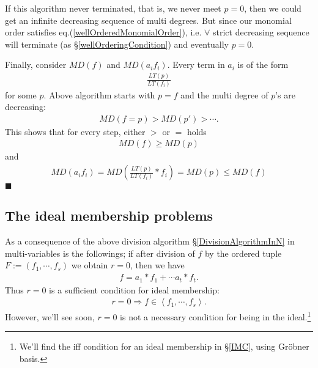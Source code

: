 \documentclass[11pt]{book}
\begin{document}
If this algorithm never terminated, that is, we never meet $p =0$, then we could get an infinite decreasing sequence of multi degrees.
But since our monomial order satisfies eq.(\ref{wellOrderedMonomialOrder}), i.e. $\forall$ strict decreasing sequence will terminate (as \S\ref{wellOrderingCondition}) and eventually $p = 0$. 

Finally, consider $MD(f)$ and $MD(a_i f_i)$.
Every term in $a_i$ is of the form 
\begin{eqnarray}
\frac{LT(p)}{LT(f_i)}
\end{eqnarray}
for some $p$.
Above algorithm starts with $p = f$ and the multi degree of $p$'s are decreasing:
\begin{eqnarray}
MD(f = p) > MD(p') > \cdots.
\end{eqnarray}
This shows that for every step, either $>$ or $=$ holds
\begin{eqnarray}
MD(f) \geq MD(p)
\end{eqnarray}
and
\begin{eqnarray}
MD(a_i f_i) = MD\left(\frac{LT(p)}{LT(f_i)}* f_i \right) = MD(p) \leq MD(f) 
\end{eqnarray}
$\blacksquare$

\subsection{The ideal membership problems}
\label{membership}
As a consequence of the above division algorithm \S\ref{DivisionAlgorithmInN} in multi-variables is the followings; if after division of $f$ by the ordered tuple $F := (f_1, \cdots, f_s)$ we obtain $r=0$, then we have
\begin{eqnarray}
f = a_1 * f_1 + \cdots a_t * f_t.
\end{eqnarray}
Thus $r = 0$ is a sufficient condition for ideal membership:
\begin{eqnarray}
r = 0 \Rightarrow f \in \left< f_1, \cdots, f_s \right>.
\end{eqnarray}
However, we'll see soon, $r=0$ is not a necessary condition for being in the ideal.\footnote{We'll find the iff condition for an ideal membership in \S\ref{IMC}, using Gr\"obner basis.}
\end{document}
